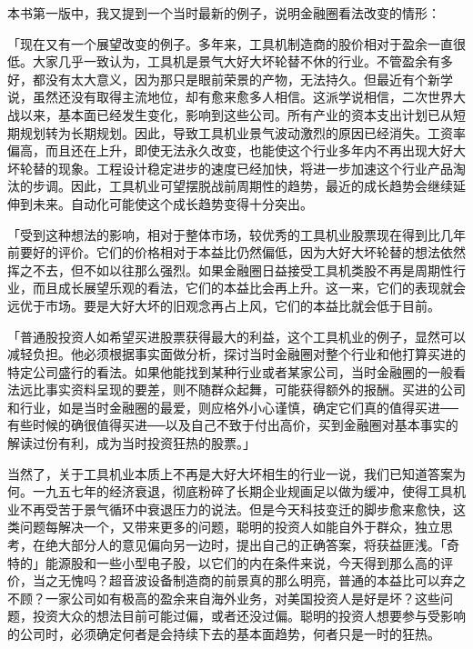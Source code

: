 \documentclass[UTF8,a4paper,zihao=-4,fontset = windows]{ctexart} %
\begin{document}
本书第一版中，我又提到一个当时最新的例子，说明金融圈看法改变的情形：

「现在又有一个展望改变的例子。多年来，工具机制造商的股价相对于盈余一直很低。大家几乎一致认为，工具机是景气大好大坏轮替不休的行业。不管盈余有多好，都没有太大意义，因为那只是眼前荣景的产物，无法持久。但最近有个新学说，虽然还没有取得主流地位，却有愈来愈多人相信。这派学说相信，二次世界大战以来，基本面已经发生变化，影响到这些公司。所有产业的资本支出计划已从短期规划转为长期规划。因此，导致工具机业景气波动激烈的原因已经消失。工资率偏高，而且还在上升，即使无法永久改变，也能使这个行业多年内不再出现大好大坏轮替的现象。工程设计稳定进步的速度已经加快，将进一步加速这个行业产品淘汰的步调。因此，工具机业可望摆脱战前周期性的趋势，最近的成长趋势会继续延伸到未来。自动化可能使这个成长趋势变得十分突出。

「受到这种想法的影响，相对于整体市场，较优秀的工具机业股票现在得到比几年前要好的评价。它们的价格相对于本益比仍然偏低，因为大好大坏轮替的想法依然挥之不去，但不如以往那么强烈。如果金融圈日益接受工具机类股不再是周期性行业，而且成长展望乐观的看法，它们的本益比会再上升。这一来，它们的表现就会远优于市场。要是大好大坏的旧观念再占上风，它们的本益比就会低于目前。

「普通股投资人如希望买进股票获得最大的利益，这个工具机业的例子，显然可以减轻负担。他必须根据事实面做分析，探讨当时金融圈对整个行业和他打算买进的特定公司盛行的看法。如果他能找到某种行业或者某家公司，当时金融圈的一般看法远比事实资料呈现的要差，则不随群众起舞，可能获得额外的报酬。买进的公司和行业，如是当时金融圈的最爱，则应格外小心谨慎，确定它们真的值得买进──有些时候的确很值得买进──以及自己不致于付出高价，买到金融圈对基本事实的解读过份有利，成为当时投资狂热的股票。」

当然了，关于工具机业本质上不再是大好大坏相生的行业一说，我们已知道答案为何。一九五七年的经济衰退，彻底粉碎了长期企业规画足以做为缓冲，使得工具机业不再受苦于景气循环中衰退压力的说法。但是今天科技变迁的脚步愈来愈快，这类问题每解决一个，又带来更多的问题，聪明的投资人如能自外于群众，独立思考，在绝大部分人的意见偏向另一边时，提出自己的正确答案，将获益匪浅。「奇特的」能源股和一些小型电子股，以它们的内在条件来说，今天得到那么高的评价，当之无愧吗？超音波设备制造商的前景真的那么明亮，普通的本益比可以弃之不顾？一家公司如有极高的盈余来自海外业务，对美国投资人是好是坏？这些问题，投资大众的想法目前可能过偏，或者还没过偏。聪明的投资人想要参与受影响的公司时，必须确定何者是会持续下去的基本面趋势，何者只是一时的狂热。
\end{document}
